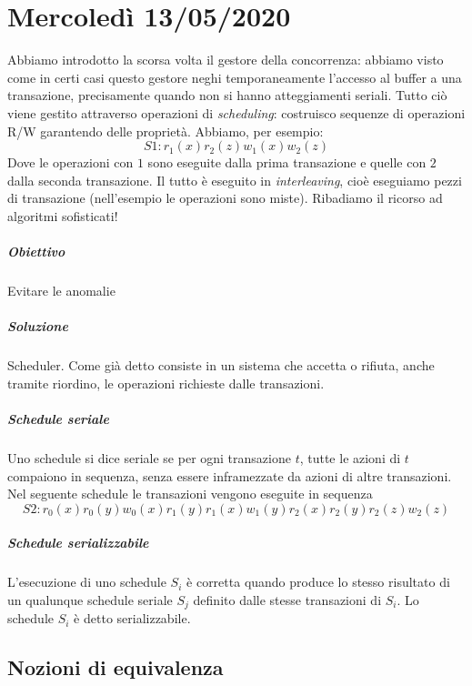 \chapter{Mercoledì 13/05/2020}
Abbiamo introdotto la scorsa volta il gestore della concorrenza: abbiamo visto come in certi casi questo gestore neghi temporaneamente l'accesso al buffer a una transazione, precisamente quando non si hanno atteggiamenti seriali. Tutto ciò viene gestito attraverso operazioni di \emph{scheduling}: costruisco sequenze di operazioni R/W garantendo delle proprietà. Abbiamo, per esempio:
\[S1: r_1(x) r_2(z) w_1(x) w_2(z)\]
Dove le operazioni con $1$ sono eseguite dalla prima transazione e quelle con $2$ dalla seconda transazione. Il tutto è eseguito in \emph{interleaving}, cioè eseguiamo pezzi di transazione (nell'esempio le operazioni sono miste). Ribadiamo il ricorso ad algoritmi sofisticati!
\paragraph{Obiettivo} Evitare le anomalie
\paragraph{Soluzione} Scheduler. Come già detto consiste in un sistema che accetta o rifiuta, anche tramite riordino, le operazioni richieste dalle transazioni.
\paragraph{Schedule seriale} Uno schedule si dice seriale se per ogni transazione $t$, tutte le azioni di $t$ compaiono in sequenza, senza essere inframezzate da azioni di altre transazioni. Nel seguente schedule le transazioni vengono eseguite in sequenza
\[S2: r_0(x)r_0(y)w_0(x)r_1(y)r_1(x)w_1(y)r_2(x)r_2(y)r_2(z)w_2(z)\]
\paragraph{Schedule serializzabile} L'esecuzione di uno schedule $S_i$ è corretta quando produce lo stesso risultato di un qualunque schedule seriale $S_j$ definito dalle stesse transazioni di $S_i$.  Lo schedule $S_i$ è detto serializzabile.
\section{Nozioni di equivalenza}

